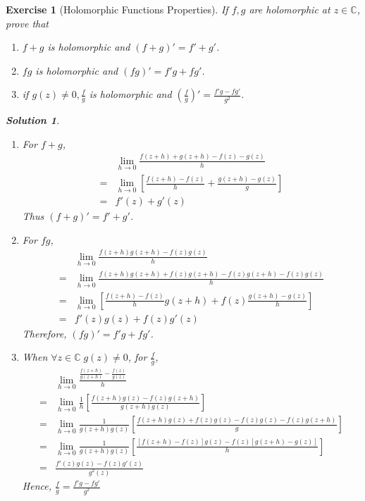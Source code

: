 \documentclass[11pt, oneside]{book}
\theoremstyle{break}
\newtheorem*{solution}{Solution}
\newtheorem{ex}{Exercise}[section]
\begin{document}
\begin{ex}[Holomorphic Functions Properties]\label{ex:holomorphic_functions_properties}
	If $f, g$ are holomorphic at $z \in \mathbb{C}$, prove that
	\begin{enumerate}
		\item $f + g$ is holomorphic and $(f + g)' = f' + g'$. \label{item:holomorphic_linearity}
		\item $fg$ is holomorphic and $(fg)' = f'g + fg'$. \label{item:holomorphic_product_rule}
		\item if $g(z) \neq 0, \frac{f}{g}$ is holomorphic and $(\frac{f}{g})' = \frac{f'g - fg'}{g^2}$. \label{item:holomorphic_quotient_rule}
	\end{enumerate}

	\begin{solution}
		\begin{enumerate}
			\item For $f + g$,
			\begin{align*}
					&\lim_{h \to 0} \frac{f(z + h) + g(z + h) - f(z) - g(z)}{h} \\
				= &\lim_{h \to 0} \left[ \frac{f(z + h) - f(z)}{h} + \frac{g(z + h) - g(z)}{g} \right] \\
				= & f'(z) + g'(z) 
			\end{align*}
			Thus $(f + g)' = f' + g'$.

			\item For $fg$,
			\begin{align*}
					&\lim_{h \to 0} \frac{f(z + h)g(z + h) - f(z)g(z)}{h} \\
				= &\lim_{h \to 0} \frac{f(z + h)g(z + h) + f(z)g(z + h) - f(z)g(z + h) - f(z)g(z)}{h} \\
				= &\lim_{h \to 0} \left[ \frac{f(z + h) - f(z)}{h} g(z + h) + f(z) \frac{g(z + h) - g(z)}{h} \right] \\
				= &f'(z)g(z) + f(z)g'(z)
			\end{align*}
			Therefore, $(fg)' = f'g + fg'$.

			\item When $\forall z \in \mathbb{C} \; g(z) \neq 0$, for $\frac{f}{g}$,
			\begin{align*}
					&\lim_{h \to 0} \frac{\frac{f(z + h)}{g(z + h)} - \frac{f(z)}{g(z)}}{h} \\
				= &\lim_{h \to 0} \frac{1}{h} \left[ \frac{f(z + h)g(z) - f(z)g(z + h)}{g(z + h)g(z)} \right] \\
				= &\lim_{h \to 0} \frac{1}{g(z + h)g(z)} \left[ \frac{f(z + h)g(z) + f(z)g(z) - f(z)g(z) - f(z)g(z + h)}{g} \right] \\
				= &\lim_{h \to 0} \frac{1}{g(z + h)g(z)} \left[ \frac{[f(z + h) - f(z)]g(z) - f(z)[g(z + h) - g(z)]}{h} \right] \\
				= &\frac{f'(z)g(z) - f(z)g'(z)}{g^2(z)}  
			\end{align*}
			Hence, $\frac{f}{g} = \frac{f'g - fg'}{g^2} $
		\end{enumerate}
	\end{solution}
\end{ex}


\end{document}
